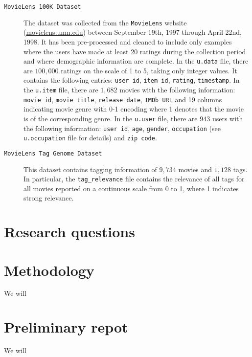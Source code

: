 \documentclass[bj, preprint]{imsart}
\begin{document}
\begin{description}
	\item[\texttt{MovieLens 100K Dataset}] The dataset was collected from the \texttt{MovieLens} website (\url{movielens.umn.edu}) between September 19th, 1997 through April 22nd, 1998. It has been pre-processed and cleaned to include only examples where the users have made at least 20 ratings during the collection period and where demographic information are complete. In the \texttt{u.data} file, there are $100,000$ ratings on the scale of 1 to 5, taking only integer values. It contains the following entries: \texttt{user id}, \texttt{item id}, \texttt{rating}, \texttt{timestamp}. In the \texttt{u.item} file, there are $1,682$ movies with the following information: \texttt{movie id}, \texttt{movie title}, \texttt{release date}, \texttt{IMDb URL} and 19 columns indicating movie genre with 0-1 encoding where 1 denotes that the movie is of the corresponding genre. In the \texttt{u.user} file, there are $943$ users with the following information: \texttt{user id}, \texttt{age}, \texttt{gender}, \texttt{occupation} (see \texttt{u.occupation} file for details) and \texttt{zip code}.
	\item[\texttt{MovieLens Tag Genome Dataset}] This dataset contains tagging information of $9,734$ movies and $1,128$ tags. In particular, the \texttt{tag\_relevance} file contains the relevance of all tags for all movies reported on a continuous scale from 0 to 1, where 1 indicates strong relevance.
\end{description}


\section{Research questions}\label{sec:setting}


\section{Methodology}\label{sec:setting}
We will 

\section{Preliminary repot}\label{sec:report}
We will 



{}
\end{document}
